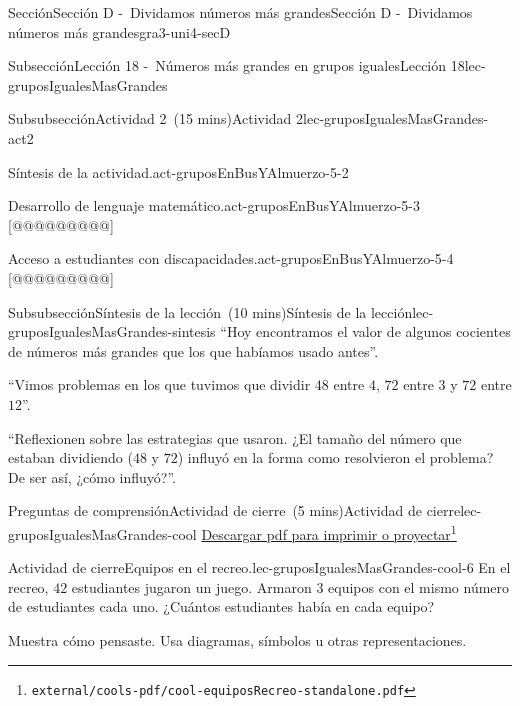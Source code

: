 \documentclass[oneside,10pt,]{article}
\begin{document}
\begin{sectionptx}{Sección}{Sección D -~Dividamos números más grandes}{}{Sección D -~Dividamos números más grandes}{}{}{gra3-uni4-secD}
\begin{subsectionptx}{Subsección}{Lección 18 -~Números más grandes en grupos iguales}{}{Lección 18}{}{}{lec-gruposIgualesMasGrandes}
\begin{subsubsectionptx}{Subsubsección}{Actividad 2~(15 mins)}{}{Actividad 2}{}{}{lec-gruposIgualesMasGrandes-act2}
\begin{paragraphs}{Síntesis de la actividad.}{act-gruposEnBusYAlmuerzo-5-2}
\begin{itemize}[label=\textbullet]
\begin{itemize}[label=$\circ$]
\end{itemize}
\end{itemize}
\end{paragraphs}%
\begin{paragraphs}{Desarrollo de lenguaje matemático.}{act-gruposEnBusYAlmuerzo-5-3}%
[@@@@@@@@@]%
\end{paragraphs}%
\begin{paragraphs}{Acceso a estudiantes con discapacidades.}{act-gruposEnBusYAlmuerzo-5-4}%
[@@@@@@@@@]%
\end{paragraphs}%
\end{subsubsectionptx}
%
%
\typeout{************************************************}
\typeout{************************************************}
%
\begin{subsubsectionptx}{Subsubsección}{Síntesis de la lección~(10 mins)}{}{Síntesis de la lección}{}{}{lec-gruposIgualesMasGrandes-sintesis}
``Hoy encontramos el valor de algunos cocientes de números más grandes que los que habíamos usado antes''.%
\par
``Vimos problemas en los que tuvimos que dividir \(48\) entre \(4\), \(72\) entre \(3\) y \(72\) entre \(12\)''.%
\par
``Reflexionen sobre las estrategias que usaron. ¿El tamaño del número que estaban dividiendo (\(48\) y \(72\)) influyó en la forma como resolvieron el problema? De ser así, ¿cómo influyó?''.%
\end{subsubsectionptx}
%
%
\typeout{************************************************}
\typeout{************************************************}
%
\begin{reading-questions-subsubsection}{Preguntas de comprensión}{Actividad de cierre~(5 mins)}{}{Actividad de cierre}{}{}{lec-gruposIgualesMasGrandes-cool}
\href{external/cools-pdf/cool-equiposRecreo-standalone.pdf}{Descargar pdf para imprimir o proyectar}\footnote{\nolinkurl{external/cools-pdf/cool-equiposRecreo-standalone.pdf}\label{lec-gruposIgualesMasGrandes-cool-5}}\begin{project}{Actividad de cierre}{Equipos en el recreo.}{lec-gruposIgualesMasGrandes-cool-6}%
En el recreo, \(42\) estudiantes jugaron un juego. Armaron \(3\) equipos con el mismo número de estudiantes cada uno. ¿Cuántos estudiantes había en cada equipo?%
\par
Muestra cómo pensaste. Usa diagramas, símbolos u otras representaciones.%
\par\smallskip%

\end{project}
\end{reading-questions-subsubsection}
\end{subsectionptx}
\end{sectionptx}
\end{document}
